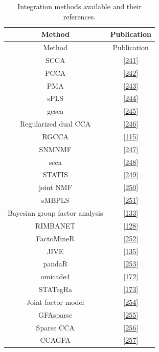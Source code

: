 \documentclass[
  12pt,
  a4paper,
  twoside,
  openright]{book}
\begin{document}
\begin{longtable}[]{@{}cc@{}}
\caption{\label{tab:appendix-methods} Integration methods available and their references.}\tabularnewline
\toprule
Method & Publication \\
\midrule
\endfirsthead
\toprule
Method & Publication \\
\midrule
\endhead
SCCA & {[}\protect\hyperlink{ref-parkhomenko2009}{241}{]} \\
PCCA & {[}\protect\hyperlink{ref-waaijenborg2008}{242}{]} \\
PMA & {[}\protect\hyperlink{ref-witten2009}{243}{]} \\
sPLS & {[}\protect\hyperlink{ref-luxeacao2009}{244}{]} \\
gesca & {[}\protect\hyperlink{ref-hwang2009}{245}{]} \\
Regularized dual CCA & {[}\protect\hyperlink{ref-soneson2010}{246}{]} \\
RGCCA & {[}\protect\hyperlink{ref-tenenhaus_regularized_2011}{115}{]} \\
SNMNMF & {[}\protect\hyperlink{ref-zhang2011}{247}{]} \\
scca & {[}\protect\hyperlink{ref-lee2011}{248}{]} \\
STATIS & {[}\protect\hyperlink{ref-abdi2012}{249}{]} \\
joint NMF & {[}\protect\hyperlink{ref-zhang2012}{250}{]} \\
sMBPLS & {[}\protect\hyperlink{ref-li2012}{251}{]} \\
Bayesian group factor analysis & {[}\protect\hyperlink{ref-virtanen2012}{133}{]} \\
RIMBANET & {[}\protect\hyperlink{ref-zhu2012}{128}{]} \\
FactoMineR & {[}\protect\hyperlink{ref-abdi2013}{252}{]} \\
JIVE & {[}\protect\hyperlink{ref-lock2013a}{135}{]} \\
pandaR & {[}\protect\hyperlink{ref-schlauch2017}{253}{]} \\
omicade4 & {[}\protect\hyperlink{ref-meng2014}{172}{]} \\
STATegRa & {[}\protect\hyperlink{ref-planell2021}{173}{]} \\
Joint factor model & {[}\protect\hyperlink{ref-ray2014}{254}{]} \\
GFAsparse & {[}\protect\hyperlink{ref-bunte2016}{255}{]} \\
Sparse CCA & {[}\protect\hyperlink{ref-chen2013}{256}{]} \\
CCAGFA & {[}\protect\hyperlink{ref-leppuxe4aho2017}{257}{]} \\

\end{longtable}
\end{document}
